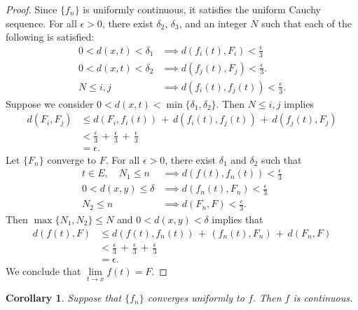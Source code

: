 \documentclass[11pt]{article}
\newtheorem{corollary}{Corollary}
\begin{document}
\begin{adjustwidth}{1cm}{}
  \begin{proof}
    Since $\{ f_{n} \}$ is uniformly continuous, it satisfies the uniform Cauchy sequence. For all $\epsilon > 0$, there exist $\delta_{2}$, $\delta_{3}$, and an integer $N$ such that each of the following is satisfied:
    \begin{align*}
      0 < d(x, t) < \delta_{1} &\implies d(f_{i}(t), F_{i}) < \frac{\epsilon}{3} \\
      0 < d(x, t) < \delta_{2} &\implies d(f_{j}(t), F_{j}) < \frac{\epsilon}{3}. \\
      N \le i, j &\implies d(f_{i}(t), f_{j}(t)) < \frac{\epsilon}{3}.
    \end{align*}
    Suppose we consider $0 < d(x, t) < \min \{ \delta_{1}, \delta_{2} \}$. Then $N \le i, j$ implies
    \begin{align*}
      d(F_{i}, F_{j}) &\le d(F_{i}, f_{i}(t)) \,+\, d(f_{i}(t), f_{j}(t)) \,+\, d(f_{j}(t), F_{j}) \\
                      &< \frac{\epsilon}{3} \,+\, \frac{\epsilon}{3} \,+\, \frac{\epsilon}{3} \\
                      &= \epsilon.
    \end{align*}
    Let $\{ F_{n} \}$ converge to $F$. For all $\epsilon > 0$, there exist $\delta_{1}$ and $\delta_{2}$ such that
    \begin{align*}
      t \in E, \quad N_{1} \le n &\implies d(f(t), f_{n}(t)) < \frac{\epsilon}{3} \\
      0 < d(x, y) \le \delta &\implies d(f_{n}(t), F_{n}) < \frac{\epsilon}{3} \\
      N_{2} \le n &\implies d(F_{n}, F) < \frac{\epsilon}{3}.
    \end{align*}
    Then $\max \{ N_{1}, N_{2} \} \le N$ and $0 < d(x, y) < \delta$ implies that
    \begin{align*}
        d(f(t), F) &\le d(f(t), f_{n}(t)) \, + \, (f_{n}(t), F_{n}) \, + \, d(F_{n}, F) \\
                 &< \frac{\epsilon}{3} \,+\, \frac{\epsilon}{3} \,+\, \frac{\epsilon}{3} \\
                 &= \epsilon.
    \end{align*}
    We conclude that $\lim\limits_{t \to x} f(t) = F$.
  \end{proof}
\end{adjustwidth}

\begin{corollary}
  Suppose that $\{ f_{n} \}$ converges uniformly to $f$. Then $f$ is continuous.
\end{corollary}
\end{document}
